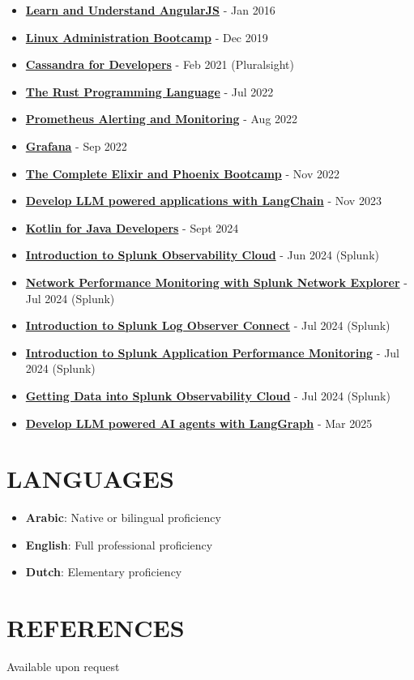 \documentclass[paper=a4,fontsize=11pt]{scrartcl} %
\newcommand{\NewPart}[1]{\section*{\uppercase{#1}}}
\begin{document}
\begin{itemize}
\item \textbf{\href{https://www.udemy.com/certificate/UC-3KQ4IOU8/}{Learn and Understand AngularJS}} - Jan 2016
\item \textbf{\href{https://www.udemy.com/certificate/UC-TPZXFYXZ/}{Linux Administration Bootcamp}} - Dec 2019
\item \textbf{\href{https://drive.google.com/file/d/1w4emc7PHAq5YQt70xippnAuZmQSZx7tR/view}{Cassandra for Developers}} - Feb 2021 (Pluralsight)
\item \textbf{\href{https://www.udemy.com/certificate/UC-21307ab6-9d1b-4119-a546-c95f931bf92f/}{The Rust Programming Language}} - Jul 2022
\item \textbf{\href{https://www.udemy.com/certificate/UC-3c8beedc-a946-4a96-8f72-a871e98ba025/}{Prometheus Alerting and Monitoring}} - Aug 2022
\item \textbf{\href{https://www.udemy.com/certificate/UC-15d5186d-6069-48d0-adb2-7e3d54a7c5ad/}{Grafana}} - Sep 2022
\item \textbf{\href{https://www.udemy.com/certificate/UC-fc7a4b3b-14f7-448a-93fc-c795bcc3dc05/}{The Complete Elixir and Phoenix Bootcamp}} - Nov 2022
\item \textbf{\href{https://www.udemy.com/certificate/UC-6e2f024d-1716-4252-94ae-e4ed6b375ceb/}{Develop LLM powered applications with LangChain}} - Nov 2023
\item \textbf{\href{https://www.udemy.com/certificate/UC-8780645d-99db-4604-a437-f24afa34a3eb/}{Kotlin for Java Developers}} - Sept 2024
\item \textbf{\href{https://www.splunk.com/}{Introduction to Splunk Observability Cloud}} - Jun 2024 (Splunk)
\item \textbf{\href{https://www.splunk.com/}{Network Performance Monitoring with Splunk Network Explorer}} - Jul 2024 (Splunk)
\item \textbf{\href{https://www.splunk.com/}{Introduction to Splunk Log Observer Connect}} - Jul 2024 (Splunk)
\item \textbf{\href{https://www.splunk.com/}{Introduction to Splunk Application Performance Monitoring}} - Jul 2024 (Splunk)
\item \textbf{\href{https://www.splunk.com/}{Getting Data into Splunk Observability Cloud}} - Jul 2024 (Splunk)
\item \textbf{\href{https://www.udemy.com/certificate/UC-df02e75c-5a40-48f9-ad82-11be237f55cf/}{Develop LLM powered AI agents with LangGraph}} - Mar 2025
\end{itemize}


\NewPart{Languages}{}

\begin{itemize}
\item \textbf{Arabic}: Native or bilingual proficiency
\item \textbf{English}: Full professional proficiency
\item \textbf{Dutch}: Elementary proficiency
\end{itemize}


\NewPart{References}{}
Available upon request
\end{document}
